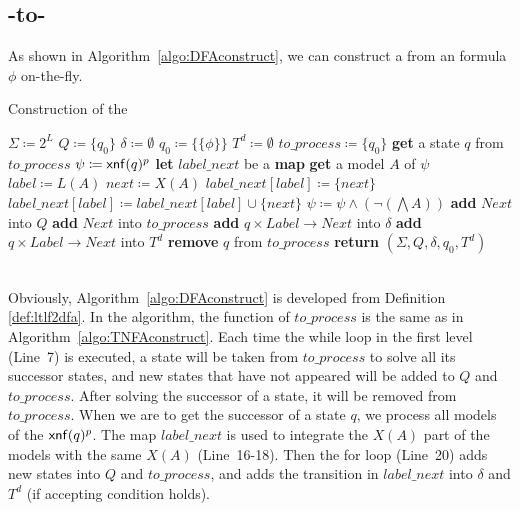 \subsection{\ltlf-to-\TDFA}
As shown in Algorithm~\ref{algo:DFAconstruct}, we can construct a \TDFA from an \ltlf formula $\phi$ on-the-fly.

\begin{algorithm}[H]\label{algo:DFAconstruct}
  \caption{Construction of the \TDFA}
  \LinesNumbered
  $\Sigma\coloneqq 2^L$\;
  $Q\coloneqq\{q_0\}$\;
  $\delta\coloneqq\emptyset$\;
  $q_0\coloneqq\{\{\phi\}\}$\;
  $T^d\coloneqq\emptyset$\;
  $to\_process\coloneqq\{q_0\}$\;
  {
    \textbf{get} a state $q$ from $to\_process$\;
    $\psi\coloneqq{\sf xnf}(q)^p$\;
    \textbf{let}  $label\_next$ be a \textbf{map}\;
    {
      \textbf{get} a model $A$ of $\psi$\;
      $label\coloneqq L(A)$\;
      $next\coloneqq X(A)$\;
      {
        $label\_next[label]\coloneqq \{next\}$\;
      }
      \Else
      {
        $label\_next[label]\coloneqq label\_next[label]\cup\{next\}$\;
      }
      $\psi\coloneqq \psi\land(\neg(\bigwedge A))$\;
    }
    {
      {
        \textbf{add} $Next$ into $Q$\;
        \textbf{add} $Next$ into $to\_process$\;
      }
      \textbf{add} $q\times Label\to Next$ into $\delta$\;
      {
        \textbf{add} $q\times Label\to Next$ into $T^d$\;
      }
    }
    \textbf{remove} $q$ from $to\_process$\;
  }
  \textbf{return} $(\Sigma,Q,\delta,q_0,T^d)$\;
\end{algorithm}
~\\
Obviously, Algorithm~\ref{algo:DFAconstruct} is developed from Definition \ref{def:ltlf2dfa}. In the algorithm, the function of $to\_process$ is the same as in Algorithm~\ref{algo:TNFAconstruct}. Each time the while loop in the first level (Line~7) is executed, a state will be taken from $to\_process$ to solve all its successor states, and new states that have not appeared will be added to $Q$ and $to\_process$. After solving the successor of a state, it will be removed from $to\_process$. When we are to get the successor of a state $q$, we process all models of the ${\sf xnf}(q)^p$. The map $label\_next$ is used to integrate the $X(A)$ part of the models with the same $X(A)$ (Line~16-18). Then the for loop (Line~20) adds new states into $Q$ and $to\_process$, and adds the transition in $label\_next$ into $\delta$ and $T^d$ (if accepting condition holds).